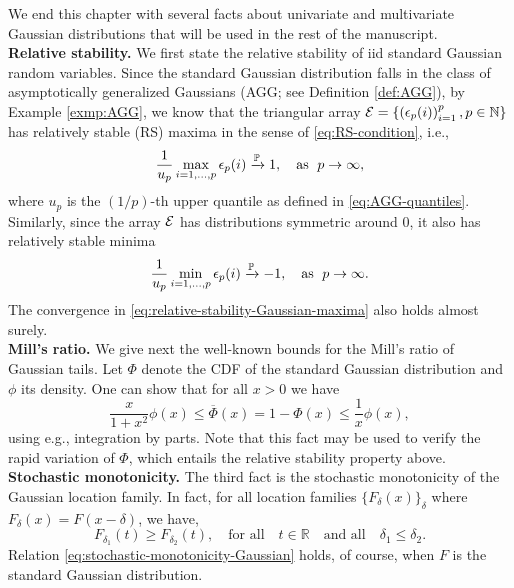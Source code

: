 
We end this chapter with several facts about univariate and multivariate Gaussian distributions that will be used in the rest of the manuscript. \\

{\bf Relative stability.} We first state the relative stability of iid standard Gaussian random variables.  Since the standard Gaussian distribution falls in the 
class of asymptotically generalized Gaussians (AGG; see Definition \ref{def:AGG}), by Example \ref{exmp:AGG}, we know that the triangular array ${\cal E} = \{\left(\epsilon_p(i)\right)_{i=1}^p, p\in\N\}$ has relatively stable (RS) maxima in the sense of \eqref{eq:RS-condition}, i.e.,
\begin{equation} \label{eq:relative-stability-Gaussian-maxima}
    \frac{1}{u_{p}} \max_{i=1,\ldots,p} \epsilon_p(i) \xrightarrow{\P} 1,\quad \text{as }\;p\to\infty,
\end{equation}
where $u_p$ is the $(1/p)$-th upper quantile as defined in \eqref{eq:AGG-quantiles}.
Similarly, since the array ${\cal E}$ has distributions symmetric around 0, it also has relatively stable minima
\begin{equation} \label{eq:relative-stability-Gaussian-minima}
    \frac{1}{u_{p}} \min_{i=1,\ldots,p} \epsilon_p(i) \xrightarrow{\P} -1,\quad \text{as }\;p\to\infty.
\end{equation}
The convergence in \eqref{eq:relative-stability-Gaussian-maxima} also holds almost surely.\\

{\bf Mill's ratio.} We give next the well-known bounds for the Mill's ratio of Gaussian tails.
Let $\Phi$ denote the CDF of the standard Gaussian distribution and $\phi$ its density.
One can show that for all $x>0$ we have
\begin{equation} \label{eq:Mills-ratio}
    \frac{x}{1+x^2}\phi(x) \le \overline{\Phi}(x) = 1-\Phi(x) \le \frac{1}{x}\phi(x),
\end{equation}
using e.g., integration by parts.  Note that this fact may be used to verify the rapid variation of $\Phi$, which entails 
the relative stability property above.\\

{\bf Stochastic monotonicity.} The third fact is the stochastic monotonicity of the Gaussian location family. 
In fact, for all location families $\{F_\delta(x)\}_\delta$ where $F_\delta(x) = F(x-\delta)$, we have,
\begin{equation} \label{eq:stochastic-monotonicity-Gaussian}
    F_{\delta_1}(t) \ge F_{\delta_2}(t), \quad \text{for all}\quad t\in\mathbb{R}\quad\text{and all}\quad \delta_1 \le \delta_2.
\end{equation}
Relation \eqref{eq:stochastic-monotonicity-Gaussian} holds, of course, when $F$ is the standard Gaussian distribution. \\

